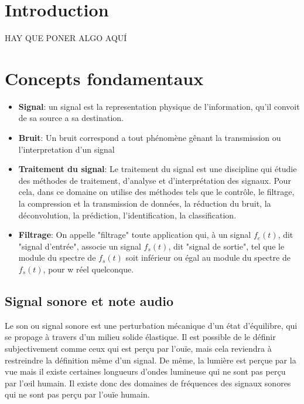\documentclass[conference,onecolumn]{IEEEtran}
\begin{document}
\section{Introduction}
HAY QUE PONER ALGO AQUÍ

\section{Concepts fondamentaux}

\begin{itemize} %
    \item[] \textbf{Signal}: un signal est la representation physique de l'information, qu'il convoit de sa source a sa destination.

    \item[] \textbf{Bruit}: Un bruit correspond a tout phénomène gênant la transmission ou l'interpretation d'un signal

    \item[] \textbf{Traitement du signal}: Le traitement du signal est une discipline qui étudie des méthodes de traitement, d’analyse et d’interprétation des signaux. Pour cela, dans ce domaine on utilise des méthodes tels que le contrôle, le filtrage, la compression et la transmission de données, la réduction du bruit, la déconvolution, la prédiction, l'identification, la classification.  

    \item[] \textbf{Filtrage}: On appelle "filtrage" toute application qui, à un signal $f_e(t)$, dit "signal d'entrée", associe un signal $f_s(t)$, dit "signal de sortie", tel que le module du spectre de $f_s(t)$ soit inférieur ou égal au module du spectre de $f_s(t)$, pour w réel quelconque. 
\end{itemize}

\subsection{Signal sonore et note audio}
Le son ou signal sonore est une perturbation mécanique d’un état d’équilibre, qui se propage à travers d’un milieu solide élastique. Il est possible de le définir subjectivement comme ceux qui est perçu par l’ouïe, mais cela reviendra à restreindre la définition même d’un signal. De même, la lumière est perçue par la vue mais il existe certaines longueurs d’ondes lumineuse qui ne sont pas perçu par l’œil humain. Il existe donc des domaines de fréquences des signaux sonores qui ne sont pas perçu par l’ouïe humain. 
\end{document}
